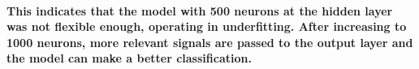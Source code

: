 \documentclass[a4paper]{article}    %
\begin{document}
\paragraph{This indicates that the model with 500 neurons at the hidden layer was not flexible enough, operating in underfitting. After increasing to 1000 neurons, more relevant signals are passed to the output layer and the model can make a better classification.}

\end{document}
